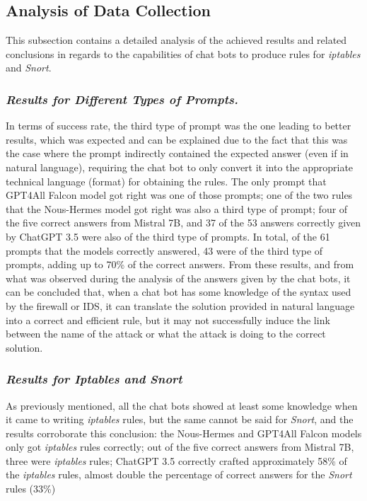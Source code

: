 \documentclass[sigconf]{acmart}
\begin{document}
\subsection{Analysis of Data Collection}

This subsection contains a detailed analysis of the achieved results
and related conclusions in regards to the capabilities of chat bots
to produce rules for {\itshape iptables} and {\itshape Snort}.

\subsubsection{{\itshape  Results for Different Types of Prompts.}}

In terms of success
rate, the third type of prompt was the one leading to better results,
which was expected and can be explained due to the fact that this
was the case where the prompt indirectly contained the expected
answer (even if in natural language), requiring the chat bot to
only convert it into the appropriate technical language (format) for
obtaining the rules. The only prompt that GPT4All Falcon model
got right was one of those prompts; one of the two rules that the
Nous-Hermes model got right was also a third type of prompt;
four of the five correct answers from Mistral 7B, and 37 of the 53
answers correctly given by ChatGPT 3.5 were also of the third type
of prompts. In total, of the 61 prompts that the models correctly
answered, 43 were of the third type of prompts, adding up to 70\%
of the correct answers. From these results, and from what was
observed during the analysis of the answers given by the chat bots,
it can be concluded that, when a chat bot has some knowledge of
the syntax used by the firewall or IDS, it can translate the solution
provided in natural language into a correct and efficient rule, but
it may not successfully induce the link between the name of the
attack or what the attack is doing to the correct solution.

\subsubsection{{\itshape  Results for Iptables and Snort}}

As previously mentioned, all
the chat bots showed at least some knowledge when it came to
writing {\itshape iptables} rules, but the same cannot be said for {\itshape Snort}, and the
results corroborate this conclusion: the Nous-Hermes and GPT4All
Falcon models only got {\itshape iptables} rules correctly; out of the five
correct answers from Mistral 7B, three were {\itshape iptables} rules; ChatGPT
3.5 correctly crafted approximately 58\% of the {\itshape iptables} rules, almost
double the percentage of correct answers for the {\itshape Snort} rules (33\%)
\end{document}
